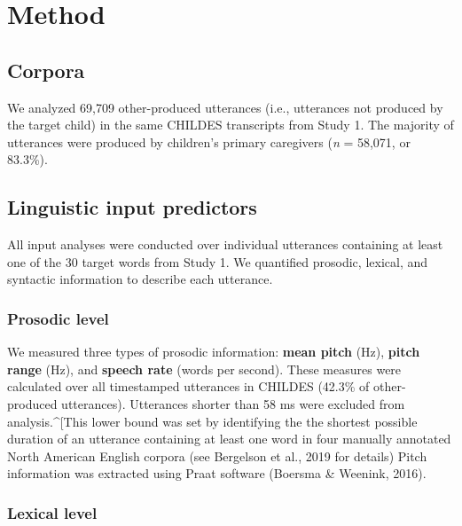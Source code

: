 \documentclass[10pt, letterpaper]{article}
\begin{document}
\hypertarget{method-1}{%
\section{Method}\label{method-1}}

\hypertarget{corpora-1}{%
\subsection{Corpora}\label{corpora-1}}

We analyzed 69,709 other-produced utterances (i.e., utterances not
produced by the target child) in the same CHILDES transcripts from Study
1. The majority of utterances were produced by children's primary
caregivers (\emph{n} = 58,071, or 83.3\%).

\hypertarget{linguistic-input-predictors}{%
\subsection{Linguistic input
predictors}\label{linguistic-input-predictors}}

All input analyses were conducted over individual utterances containing
at least one of the 30 target words from Study 1. We quantified
prosodic, lexical, and syntactic information to describe each utterance.

\hypertarget{prosodic-level}{%
\subsubsection{Prosodic level}\label{prosodic-level}}

We measured three types of prosodic information: \textbf{mean pitch}
(Hz), \textbf{pitch range} (Hz), and \textbf{speech rate} (words per
second). These measures were calculated over all timestamped utterances
in CHILDES (42.3\% of other-produced utterances). Utterances shorter
than 58 ms were excluded from analysis.\^{}{[}This lower bound was set
by identifying the the shortest possible duration of an utterance
containing at least one word in four manually annotated North American
English corpora (see Bergelson et al., 2019 for details) Pitch
information was extracted using Praat software (Boersma \& Weenink,
2016).

\hypertarget{lexical-level}{%
\subsubsection{Lexical level}\label{lexical-level}}
\end{document}
